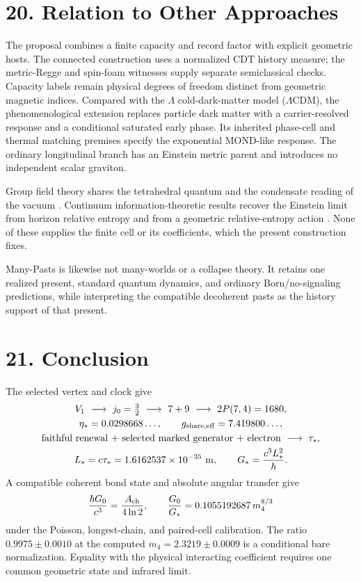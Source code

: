 \documentclass[11pt]{article}
\begin{document}
\section{20. Relation to Other Approaches}

The proposal combines a finite capacity and record factor with explicit geometric hosts. The connected construction uses a normalized CDT history measure; the metric-Regge and spin-foam witnesses supply separate semiclassical checks. Capacity labels remain physical degrees of freedom distinct from geometric magnetic indices. Compared with the $\Lambda$ cold-dark-matter model ($\Lambda$CDM), the phenomenological extension replaces particle dark matter with a carrier-resolved response and a conditional saturated early phase. Its inherited phase-cell and thermal matching premises specify the exponential MOND-like response. The ordinary longitudinal branch has an Einstein metric parent and introduces no independent scalar graviton.

Group field theory shares the tetrahedral quantum and the condensate reading of the vacuum \citep{Oriti2009,Oriti2016,Gielen2013,OritiSindoniWilsonEwing2016}. Continuum information-theoretic results recover the Einstein limit from horizon relative entropy \citep{Jacobson1995,DorauMuch2026} and from a geometric relative-entropy action \citep{Bianconi2025,Bianconi2026}. None of these supplies the finite cell or its coefficients, which the present construction fixes.

Many-Pasts is likewise not many-worlds or a collapse theory. It retains one realized present, standard quantum dynamics, and ordinary Born/no-signaling predictions, while interpreting the compatible decoherent pasts as the history support of that present.

\section{21. Conclusion}

The selected vertex and clock give
\[
\begin{gathered}
V_1\ \longrightarrow\ j_0=\tfrac32\ \longrightarrow\ 7+9
\ \longrightarrow\ 2P(7,4)=1680,\\
\eta_*=0.0298668\ldots,\qquad g_{\rm share,eff}=7.419800\ldots,\\
\text{faithful renewal + selected marked generator + electron}
\ \longrightarrow\ \tau_*,\\
L_*=c\tau_*=1.6162537\times10^{-35}\ {\rm m},
\qquad G_*=\frac{c^3L_*^2}{\hbar}.
\end{gathered}
\]
A compatible coherent bond state and absolute angular transfer give
\[
\frac{\hbar G_0}{c^3}=\frac{A_{\rm ch}}{4\ln2},\qquad
\frac{G_0}{G_*}=0.1055192687\,m_4^{8/3}
\]
under the Poisson, longest-chain, and paired-cell calibration. The ratio $0.9975\pm0.0010$ at the computed $m_4=2.3219\pm0.0009$ is a conditional bare normalization. Equality with the physical interacting coefficient requires one common geometric state and infrared limit.
\end{document}
